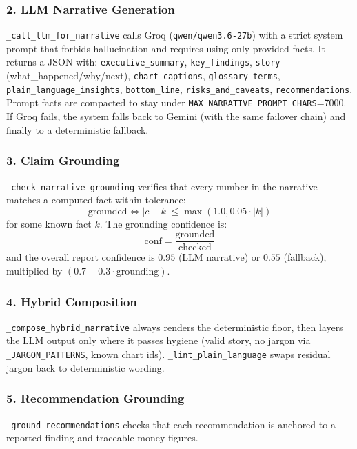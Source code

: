 \documentclass[12pt,a4paper,openany]{report}
\begin{document}
\subsubsection{2. LLM Narrative Generation}
\texttt{\_call\_llm\_for\_narrative} calls Groq (\texttt{qwen/qwen3.6-27b}) with a strict system prompt that forbids hallucination and requires using only provided facts. It returns a JSON with: \texttt{executive\_summary}, \texttt{key\_findings}, \texttt{story} (what\_happened/why/next), \texttt{chart\_captions}, \texttt{glossary\_terms}, \texttt{plain\_language\_insights}, \texttt{bottom\_line}, \texttt{risks\_and\_caveats}, \texttt{recommendations}. Prompt facts are compacted to stay under \texttt{MAX\_NARRATIVE\_PROMPT\_CHARS}=7000. If Groq fails, the system falls back to Gemini (with the same failover chain) and finally to a deterministic fallback.

\subsubsection{3. Claim Grounding}
\texttt{\_check\_narrative\_grounding} verifies that every number in the narrative matches a computed fact within tolerance:
\begin{equation}
\text{grounded} \iff |c - k| \le \max(1.0, 0.05 \cdot |k|)
\label{eq:claim-grounding}
\end{equation}
for some known fact $k$. The grounding confidence is:
\begin{equation}
\text{conf} = \frac{\text{grounded}}{\text{checked}}
\label{eq:grounding-confidence}
\end{equation}
and the overall report confidence is $0.95$ (LLM narrative) or $0.55$ (fallback), multiplied by $(0.7 + 0.3 \cdot \text{grounding})$.

\subsubsection{4. Hybrid Composition}
\texttt{\_compose\_hybrid\_narrative} always renders the deterministic floor, then layers the LLM output only where it passes hygiene (valid story, no jargon via \texttt{\_JARGON\_PATTERNS}, known chart ids). \texttt{\_lint\_plain\_language} swaps residual jargon back to deterministic wording.

\subsubsection{5. Recommendation Grounding}
\texttt{\_ground\_recommendations} checks that each recommendation is anchored to a reported finding and traceable money figures.
\end{document}
